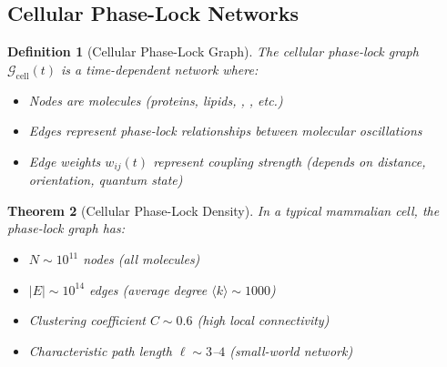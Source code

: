 \documentclass[11pt]{article}
\newtheorem{theorem}{Theorem}[section]
\newtheorem{definition}[theorem]{Definition}
\theoremstyle{remark}
\begin{document}
\subsection{Cellular Phase-Lock Networks}

\begin{definition}[Cellular Phase-Lock Graph]
\label{def:cellular_phase_lock}
The cellular phase-lock graph $\mathcal{G}_{\text{cell}}(t)$ is a time-dependent network where:
\begin{itemize}
\item Nodes are molecules (proteins, lipids, , , etc.)
\item Edges represent phase-lock relationships between molecular oscillations
\item Edge weights $w_{ij}(t)$ represent coupling strength (depends on distance, orientation, quantum state)
\end{itemize}
\end{definition}

\begin{theorem}[Cellular Phase-Lock Density]
\label{thm:cellular_density}
In a typical mammalian cell, the phase-lock graph has:
\begin{itemize}
\item $N \sim 10^{11}$ nodes (all molecules)
\item $|E| \sim 10^{14}$ edges (average degree $\langle k \rangle \sim 1000$)
\item Clustering coefficient $C \sim 0.6$ (high local connectivity)
\item Characteristic path length $\ell \sim 3$--$4$ (small-world network)
\end{itemize}
\end{theorem}
\end{document}
